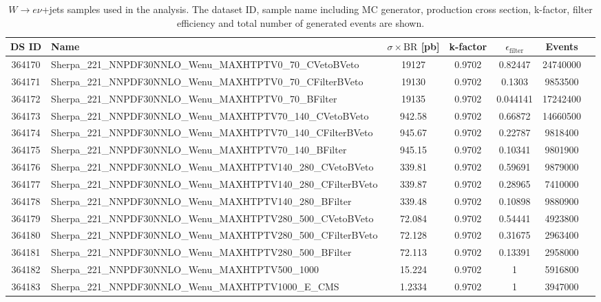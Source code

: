 \begin{landscape}

\begin{table}[p]
\caption[$W\to e\nu+$ jets Monte Carlo samples for background estimation]{$W \to e\nu$+jets samples used in the analysis. The dataset ID, sample name including MC generator, production cross section, k-factor, filter efficiency and total number of generated events are shown.}
\label{tabular:mc_samples_Wenujets}
\begin{footnotesize}
\begin{center}
\begin{tabular}{c|l|c|c|c|cr}
	\hline\hline
	DS ID & Name & $\sigma\times\text{BR}$ [pb] & k-factor & $\epsilon_{\text{filter}}$ & Events \\ \hline\hline
364170 & Sherpa\_221\_NNPDF30NNLO\_Wenu\_MAXHTPTV0\_70\_CVetoBVeto & 19127 & 0.9702 & 0.82447 & 24740000 \\
364171 & Sherpa\_221\_NNPDF30NNLO\_Wenu\_MAXHTPTV0\_70\_CFilterBVeto & 19130 & 0.9702 & 0.1303 & 9853500 \\
364172 & Sherpa\_221\_NNPDF30NNLO\_Wenu\_MAXHTPTV0\_70\_BFilter & 19135 & 0.9702 & 0.044141 & 17242400 \\
364173 & Sherpa\_221\_NNPDF30NNLO\_Wenu\_MAXHTPTV70\_140\_CVetoBVeto & 942.58 & 0.9702 & 0.66872 & 14660500 \\
364174 & Sherpa\_221\_NNPDF30NNLO\_Wenu\_MAXHTPTV70\_140\_CFilterBVeto & 945.67 & 0.9702 & 0.22787 & 9818400 \\
364175 & Sherpa\_221\_NNPDF30NNLO\_Wenu\_MAXHTPTV70\_140\_BFilter & 945.15 & 0.9702 & 0.10341 & 9801900 \\
364176 & Sherpa\_221\_NNPDF30NNLO\_Wenu\_MAXHTPTV140\_280\_CVetoBVeto & 339.81 & 0.9702 & 0.59691 & 9879000 \\
364177 & Sherpa\_221\_NNPDF30NNLO\_Wenu\_MAXHTPTV140\_280\_CFilterBVeto & 339.87 & 0.9702 & 0.28965 & 7410000 \\
364178 & Sherpa\_221\_NNPDF30NNLO\_Wenu\_MAXHTPTV140\_280\_BFilter & 339.48 & 0.9702 & 0.10898 & 9880900 \\
364179 & Sherpa\_221\_NNPDF30NNLO\_Wenu\_MAXHTPTV280\_500\_CVetoBVeto & 72.084 & 0.9702 & 0.54441 & 4923800 \\
364180 & Sherpa\_221\_NNPDF30NNLO\_Wenu\_MAXHTPTV280\_500\_CFilterBVeto & 72.128 & 0.9702 & 0.31675 & 2963400 \\
364181 & Sherpa\_221\_NNPDF30NNLO\_Wenu\_MAXHTPTV280\_500\_BFilter & 72.113 & 0.9702 & 0.13391 & 2958000 \\
364182 & Sherpa\_221\_NNPDF30NNLO\_Wenu\_MAXHTPTV500\_1000 & 15.224 & 0.9702 & 1 & 5916800 \\
364183 & Sherpa\_221\_NNPDF30NNLO\_Wenu\_MAXHTPTV1000\_E\_CMS & 1.2334 & 0.9702 & 1 & 3947000 \\
	\hline\hline
\end{tabular}
\end{center}
\end{footnotesize}
\end{table}


\end{landscape}
